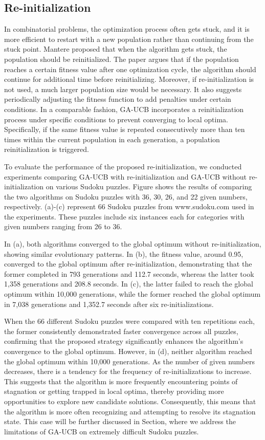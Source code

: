 \documentclass{article}
\begin{document}
\subsection{Re-initialization}

In combinatorial problems, the optimization process often gets stuck, and it is more efficient to restart with a new population rather than continuing from the stuck point. Mantere proposed that when the algorithm gets stuck, the population should be reinitialized. The paper argues that if the population reaches a certain fitness value after one optimization cycle, the algorithm should continue for additional time before reinitializing. Moreover, if re-initialization is not used, a much larger population size would be necessary. It also suggests periodically adjusting the fitness function to add penalties under certain conditions. In a comparable fashion, GA-UCB incorporates a reinitialization process under specific conditions to prevent converging to local optima. Specifically, if the same fitness value is repeated consecutively more than ten times within the current population in each generation, a population reinitialization is triggered.

To evaluate the performance of the proposed re-initialization, we conducted experiments comparing GA-UCB with re-initialization and GA-UCB without re-initialization on various Sudoku puzzles. Figure shows the results of comparing the two algorithms on Sudoku puzzles with 36, 30, 26, and 22 given numbers, respectively. (a)-(c) represent 66 Sudoku puzzles from www.sudoku.com used in the experiments. These puzzles include six instances each for categories with given numbers ranging from 26 to 36.

In (a), both algorithms converged to the global optimum without re-initialization, showing similar evolutionary patterns. In (b), the fitness value, around 0.95, converged to the global optimum after re-initialization, demonstrating that the former completed in 793 generations and 112.7 seconds, whereas the latter took 1,358 generations and 208.8 seconds. In (c), the latter failed to reach the global optimum within 10,000 generations, while the former reached the global optimum in 7,038 generations and 1,352.7 seconds after six re-initializations.

When the 66 different Sudoku puzzles were compared with ten repetitions each, the former consistently demonstrated faster convergence across all puzzles, confirming that the proposed strategy significantly enhances the algorithm's convergence to the global optimum. However, in (d), neither algorithm reached the global optimum within 10,000 generations. As the number of given numbers decreases, there is a tendency for the frequency of re-initializations to increase. This suggests that the algorithm is more frequently encountering points of stagnation or getting trapped in local optima, thereby providing more opportunities to explore new candidate solutions. Consequently, this means that the algorithm is more often recognizing and attempting to resolve its stagnation state. This case will be further discussed in Section, where we address the limitations of GA-UCB on extremely difficult Sudoku puzzles.
\end{document}
